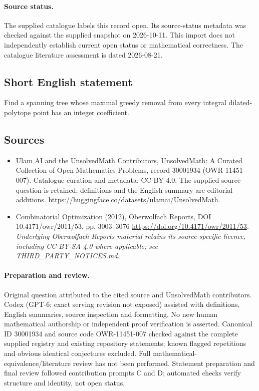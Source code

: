 \documentclass[11pt]{article}
\begin{document}
\paragraph{Source status.}
The supplied catalogue labels this record open. Its source-status metadata was checked against the supplied snapshot on 2026-10-11. This import does not independently establish current open status or mathematical correctness. The catalogue literature assessment is dated 2026-08-21.
\subsection{Short English statement}
Find a spanning tree whose maximal greedy removal from every integral dilated-polytope point has an integer coefficient.
\subsection{Sources}
\begin{itemize}
\item[S1] Ulam AI and the UnsolvedMath Contributors, UnsolvedMath: A Curated Collection of Open Mathematics Problems, record 30001934 (OWR-11451-007). Catalogue curation and metadata: CC BY 4.0. The supplied source question is retained; definitions and the English summary are editorial additions.
\url{https://huggingface.co/datasets/ulamai/UnsolvedMath}.
\item[S2] Combinatorial Optimization (2012), Oberwolfach Reports, DOI 10.4171/owr/2011/53, pp. 3003--3076
\url{https://doi.org/10.4171/owr/2011/53}.
\textit{Underlying Oberwolfach Reports material retains its source-specific licence, including CC BY-SA 4.0 where applicable; see THIRD\_PARTY\_NOTICES.md.}
\end{itemize}
\paragraph{Preparation and review.}
Original question attributed to the cited source and UnsolvedMath contributors. Codex (GPT-6; exact serving revision not exposed) assisted with definitions, English summaries, source inspection and formatting. No new human mathematical authorship or independent proof verification is asserted. Canonical ID 30001934 and source code OWR-11451-007 checked against the complete supplied registry and existing repository statements; known flagged repetitions and obvious identical conjectures excluded. Full mathematical-equivalence/literature review has not been performed. Statement preparation and final review followed contribution prompts C and D; automated checks verify structure and identity, not open status.
\label{end:30001934}
\end{document}
